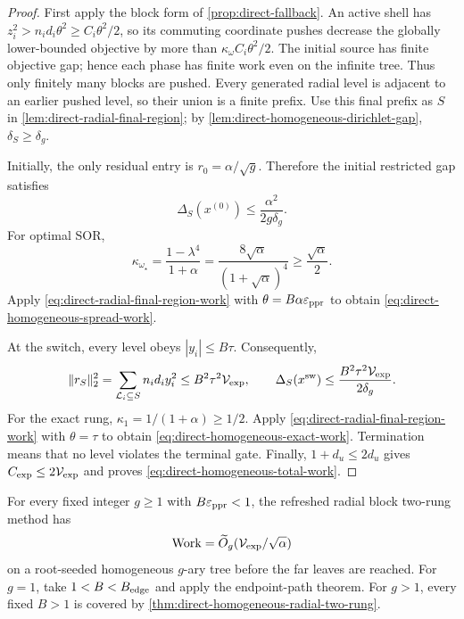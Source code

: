 \begin{proof}
First apply the block form of \cref{prop:direct-fallback}.  An active shell
has $z_i^2>n_id_i\theta^2\geq C_i\theta^2/2$, so its commuting coordinate
pushes decrease the globally lower-bounded objective by more than
$\kappa_\omega C_i\theta^2/2$.  The initial source has finite objective gap;
hence each phase has finite work even on the infinite tree.  Thus only
finitely many blocks are pushed.  Every generated radial level is adjacent
to an earlier pushed level, so their union is a finite prefix.  Use this
final prefix as $S$ in \cref{lem:direct-radial-final-region}; by
\cref{lem:direct-homogeneous-dirichlet-gap}, $\delta_S\geq\delta_g$.

Initially, the only residual entry is $r_0=\alpha/\sqrt g$.  Therefore the
initial restricted gap satisfies
\begin{equation*}
 \Delta_S(x^{(0)})
 \leq\frac{\alpha^2}{2g\delta_g}.
\end{equation*}
For optimal SOR,
\begin{equation*}
 \kappa_{\omega_\star}
 =\frac{1-\lambda^4}{1+\alpha}
 =\frac{8\sqrt\alpha}{(1+\sqrt\alpha)^4}
 \geq\frac{\sqrt\alpha}{2}.
\end{equation*}
Apply \cref{eq:direct-radial-final-region-work} with
$\theta=B\alpha\varepsilon_{\mathrm{ppr}}$ to obtain
\cref{eq:direct-homogeneous-spread-work}.

At the switch, every level obeys $|y_i|\leq B\tau$.  Consequently,
\begin{equation*}
 \lVert r_S\rVert_2^2
 =\sum_{\mathcal L_i\subseteq S}n_id_i y_i^2
 \leq B^2\tau^2\mathcal V_{\rm exp},
 \qquad
 \Delta_S(x^{\rm sw})
 \leq\frac{B^2\tau^2\mathcal V_{\rm exp}}{2\delta_g}.
\end{equation*}
For the exact rung,
$\kappa_1=1/(1+\alpha)\geq1/2$.  Apply
\cref{eq:direct-radial-final-region-work} with $\theta=\tau$ to obtain
\cref{eq:direct-homogeneous-exact-work}.  Termination means that no level
violates the terminal gate.  Finally, $1+d_u\leq2d_u$ gives
$C_{\rm exp}\leq2\mathcal V_{\rm exp}$ and proves
\cref{eq:direct-homogeneous-total-work}.
\end{proof}

\begin{corollary}
\label{cor:direct-all-homogeneous-radial}
For every fixed integer $g\geq1$ with $B\varepsilon_{\mathrm{ppr}}<1$, the refreshed radial
block two-rung method has
\begin{equation*}
 \operatorname{Work}=\widetilde O_g(\mathcal V_{\rm exp}/\sqrt\alpha)
\end{equation*}
on a root-seeded homogeneous $g$-ary tree before the far leaves are reached.
For $g=1$, take $1<B<B_{\rm edge}$ and apply the endpoint-path theorem.  For
$g>1$, every fixed $B>1$ is covered by
\cref{thm:direct-homogeneous-radial-two-rung}.
\end{corollary}

